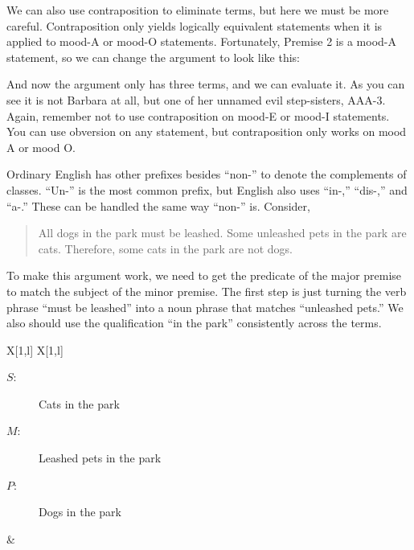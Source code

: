 \begin{kormanize}
\end{kormanize}

We can also use contraposition to eliminate terms, but here we must be more careful. Contraposition only yields logically equivalent statements when it is applied to mood-A or mood-O statements. Fortunately, Premise 2 is a mood-A statement, so we can change the argument to look like this:

\begin{kormanize}
\end{kormanize}

And now the argument only has three terms, and we can evaluate it. As you can see it is not Barbara at all, but one of her unnamed evil step-sisters, AAA-3. Again, remember not to use contraposition on mood-E or mood-I statements. You can use obversion on any statement, but contraposition only works on mood A or mood O.

Ordinary English has other prefixes besides ``non-'' to denote the complements of classes. ``Un-'' is the most common prefix, but English also uses ``in-,'' ``dis-,'' and ``a-.'' These can be handled the same way ``non-'' is. Consider,

\begin{quotation}
All dogs in the park must be leashed. Some unleashed pets in the park are cats. Therefore, some cats in the park are not dogs.
\end{quotation}

To make this argument work, we need to get the predicate of the major premise to match the subject of the minor premise. The first step is just turning the verb phrase ``must be leashed'' into a noun phrase that matches ``unleashed pets.'' We also should use the qualification ``in the park'' consistently across the terms.

\begin{tabu}{{X[1,l] X[1,l]}}

\begin{description}
\item[$S$:] Cats in the park
\item[$M$:] Leashed pets in the park
\item[$P$:] Dogs in the park
\end{description}

&

\begin{kormanize}
\end{kormanize}

\end{tabu}

